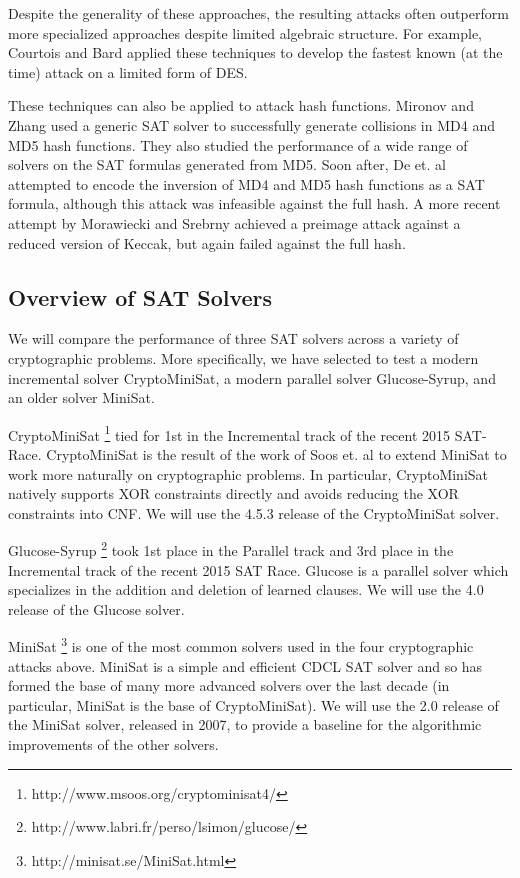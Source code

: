 Despite the generality of these approaches, the resulting attacks often outperform more specialized approaches despite limited algebraic structure. For example, Courtois and Bard \cite{CB07} applied these techniques to develop the fastest known (at the time) attack on a limited form of DES.

These techniques can also be applied to attack hash functions. Mironov and Zhang \cite{MZ06} used a generic SAT solver to successfully generate collisions in MD4 and MD5 hash functions. They also studied the performance of a wide range of solvers on the SAT formulas generated from MD5. Soon after, De et. al \cite{DKV07} attempted to encode the inversion of MD4 and MD5 hash functions as a SAT formula, although this attack was infeasible against the full hash. A more recent attempt by Morawiecki and Srebrny \cite{MS13} achieved a preimage attack against a reduced version of Keccak, but again failed against the full hash.

\subsection{Overview of SAT Solvers}
\label{sec:related:solvers}

We will compare the performance of three SAT solvers across a variety of cryptographic problems. More specifically, we have selected to test a modern incremental solver CryptoMiniSat, a modern parallel solver Glucose-Syrup, and an older solver MiniSat.

CryptoMiniSat \footnote{http://www.msoos.org/cryptominisat4/} tied for 1st in the Incremental track of the recent 2015 SAT-Race. CryptoMiniSat is the result of the work of Soos et. al \cite{SNC09} to extend MiniSat to work more naturally on cryptographic problems.  In particular, CryptoMiniSat natively supports XOR constraints directly and avoids reducing the XOR constraints into CNF. We will use the 4.5.3 release of the CryptoMiniSat solver.

Glucose-Syrup \footnote{http://www.labri.fr/perso/lsimon/glucose/} took 1st place in the Parallel track and 3rd place in the Incremental track of the recent 2015 SAT Race. Glucose is a parallel solver which specializes in the addition and deletion of learned clauses. We will use the 4.0 release of the Glucose solver.

MiniSat \footnote{http://minisat.se/MiniSat.html} is one of the most common solvers used in the four cryptographic attacks above. MiniSat is a simple and efficient CDCL SAT solver and so has formed the base of many more advanced solvers over the last decade (in particular, MiniSat is the base of CryptoMiniSat). We will use the 2.0 release of the MiniSat solver, released in 2007, to provide a baseline for the algorithmic improvements of the other solvers.

